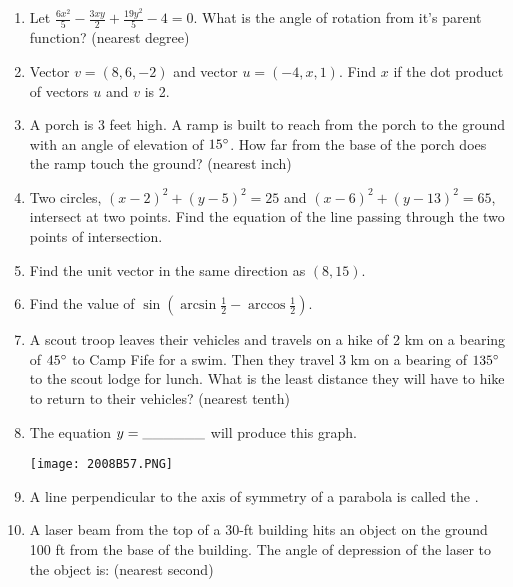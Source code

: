 \documentclass[../uilmath.tex]{subfiles}
\begin{document}
\begin{enumerate}[label=\bfseries\arabic*.]
    \item %
    Let $\frac{6x^2}{5}-\frac{3xy}{2}+\frac{19y^2}{5}-4=0$. What is the angle of rotation from it's parent function? (nearest degree)

    \item %
    Vector $v=(8,6,-2)$ and vector $u=(-4,x,1)$. Find $x$ if the dot product of vectors $u$ and $v$ is 2.

    \item %
    A porch is 3 feet high. A ramp is built to reach from the porch to the ground with an angle of elevation of $15\degree$.
    How far from the base of the porch does the ramp touch the ground? (nearest inch)

    \item %
    Two circles, $(x-2)^2+(y-5)^2=25$ and $(x-6)^2+(y-13)^2=65$, intersect at two points. Find the equation of the line passing through the two points of intersection.

    \item %
    Find the unit vector in the same direction as $(8,15)$.

    \item %
    Find the value of $\sin(\arcsin\frac{1}{2}-\arccos \frac{1}{2})$.

    \item %
    A scout troop leaves their vehicles and travels on a hike of 2 km on a bearing of $45\degree$ to Camp Fife for a swim. Then they travel 3 km on a bearing of $135\degree$ to the scout lodge for lunch. What is the 
    least distance they will have to hike to return to their vehicles? (nearest tenth)

    \item %
    The equation $y=\_\_\_\_\_\_$ will produce this graph.
    \begin{center}
        \texttt{[image: 2008B57.PNG]}
    \end{center}

    \item %
    A line perpendicular to the axis of symmetry of a parabola is called the \blank .

    \item %
    A laser beam from the top of a 30-ft building hits an object on the ground 100 ft from the base of the building. The angle of depression of the laser to the object is: (nearest second)


\end{enumerate}
\end{document}
